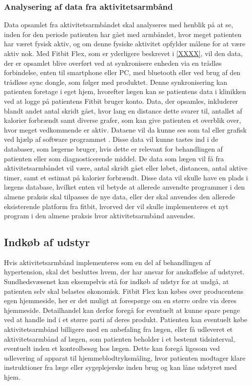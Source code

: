 \subsubsection{Analysering af data fra aktivitetsarmbånd}  
Data opsamlet fra aktivitetsarmbåndet skal analyseres med henblik på at se, inden for den periode patienten har gået med armbåndet, hvor meget patienten har været fysisk aktiv, og om denne fysiske aktivitet opfylder målene for at være aktiv nok.  
Med Fitbit Flex, som er yderligere beskrevet i \autoref{XXXX}, vil den data, der er opsamlet blive overført ved at synkronisere enheden via en trådløs forbindelse, enten til smartphone eller PC, med bluetooth eller ved brug af den trådløse sync dongle, som følger med produktet. Denne synkronisering kan patienten foretage i eget hjem, hvorefter lægen kan se patientens data i klinikken ved at logge på patientens Fitbit bruger konto. Data, der opsamles, inkluderer blandt andet antal skridt gået, hvor lang en distance dette svarer til, antallet af kalorier forbrændt samt diverse grafer, som kan give patienten et overblik over, hvor meget vedkommende er aktiv. Dataene vil da kunne ses som tal eller grafisk ved hjælp af software programmet \citep{fitbitflex}. Disse data vil kunne tastes ind i de databaser, som lægerne bruger, hvis dette er relevant for behandlingen af patienten eller som diagnosticerende middel. De data som lægen vil få fra aktivitetsarmbåndet vil være, antal skridt gået eller løbet, distancen, antal aktive timer, samt et estimat på kalorier forbrændt. Disse data vil skulle have en plads i lægens database, hvilket enten vil betyde at allerede anvendte programmer i den almene praksis skal tilpasses de nye data, eller der skal anvendes den allerede eksisterende platform fra fitbit, hvorved der vil skulle implementeres et nyt program i den almene praksis hvor aktivitetsarmbånd anvendes. 

\subsection{Indkøb af udstyr}	
Hvis aktivitetsarmbånd implementeres som en del af behandlingen af hypertension, skal det besluttes hvem, der har ansvar for anskaffelse af udstyret. Sundhedsvæsenet kan eksempelvis stå for indkøb af udstyr for at undgå, at patienten selv skal belastes økonomisk. 
Fitbit Flex kan købes over producentens egen hjemmeside, her er det muligt at forespørge om en større ordre via deres hjemmeside. Detailhandel kan derfor foregå for eventuelt at kunne spare penge ved at handle ind i et større parti af deres produkt.
Patienten kan eventuelt købe aktivitetsarmbånd billigere med en anbefaling fra lægen, eller få udleveret et aktivitetsarmbånd af lægen, som patienten beholder i et bestemt tidsinterval, eventuelt inden et kontrolbesøg hos lægen. Dette kan foregå ligesom ved udlevering af apparat til hjemmeblodtryksmåling, hvor patienten modtager klare instruktioner fra læge eller sygeplejerske inden brug og kan låne udstyret med hjem.

